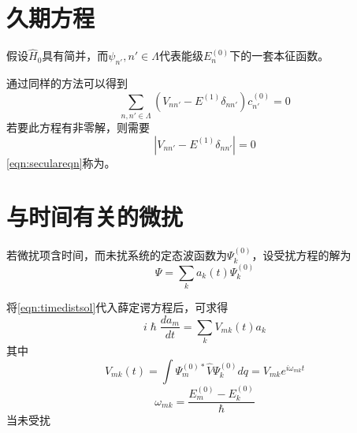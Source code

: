 \documentclass[12pt, a4paper, oneside]{ctexbook}
\newcommand{\hl}[1]{\hlbox{#1}}
\newcounter{#2}
\newcounter{#2}[#1]
\numberwithin{#2}{#1}
\newcommand{\xkuo}[1]{\left(#1\right)}
\newcommand{\dao}[2]{\frac{d#1}{d#2}}
\begin{document}
            \section{久期方程}
            \begin{assmp}
              假设\(\hat H_0\)具有简并，而\(\psi_{n'},n'\in\Lambda \)代表能级\(E_n^{(0)}\)下的一套本征函数。
            \end{assmp}
            \begin{theorem}
              通过同样的方法可以得到
              \begin{equation}
                \sum_{n,n'\in \Lambda }\xkuo{V_{nn'}-E^{(1)}\delta_{nn'}}c_{n'}^{(0)}=0
              \end{equation}
              若要此方程有非零解，则需要
              \begin{equation}\label{eqn:seculareqn}
                |V_{nn'}-E^{(1)}\delta_{nn'}|=0
              \end{equation}
              \autoref{eqn:seculareqn}称为\hl{久期方程}。
            \end{theorem}
            \section{与时间有关的微扰}
            \begin{assmp}
              若微扰项含时间，而未扰系统的定态波函数为\(\Psi_k^{(0)}\)，设受扰方程的解为
              \begin{equation}\label{eqn:timedistsol}
                \Psi=\sum_ka_k(t)\Psi_k^{(0)}
              \end{equation}
            \end{assmp}

            \begin{theorem}
              将\autoref{eqn:timedistsol}代入薛定谔方程后，可求得
              \begin{equation}
                i\hslash\dao{a_m}{t}=\sum_kV_{mk}(t)a_k
              \end{equation}
              其中
              \begin{equation}
                V_{mk}(t)=\int\Psi_m^{(0)*}\hat V\Psi_k^{(0)}dq=V_{mk}e^{i\omega_{mk}t}
              \end{equation}
              \begin{equation}
                \omega_{mk}=\frac{E_m^{(0)}-E_k^{(0)}}{\hslash}
              \end{equation}
              当未受扰
            \end{theorem}
\end{document}
